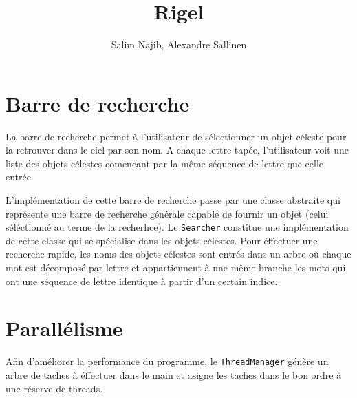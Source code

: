 \documentclass[10pt,a4paper]{report}
\author{Salim Najib, Alexandre Sallinen}
\title{Rigel}
\begin{document}
\newcommand{\code}[1]{\texttt{#1}}
\section{Barre de recherche}

La barre de recherche permet à l'utilisateur de sélectionner un objet céleste pour la retrouver dans le ciel par son nom. A chaque lettre tapée, l'utilisateur voit une liste des objets célestes comencant par la même séquence de lettre que celle entrée. 

L'implémentation de cette barre de recherche passe par une classe abstraite qui représente une barre de recherche générale capable de fournir un objet (celui séléctionné au terme de la recherhce). Le \code{Searcher} constitue une implémentation de cette classe qui se spécialise dans les objets célestes. Pour éffectuer une recherche rapide, les noms des objets célestes sont entrés dans un arbre où chaque mot est décomposé par lettre et appartiennent à une même branche les mots qui ont une séquence de lettre identique à partir d'un certain indice.

\section{Parallélisme}

Afin d'améliorer la performance du programme, le \code{ThreadManager} génère un arbre de taches à éffectuer dans le main et asigne les taches dans le bon ordre à une réserve de threads.
\end{document}
